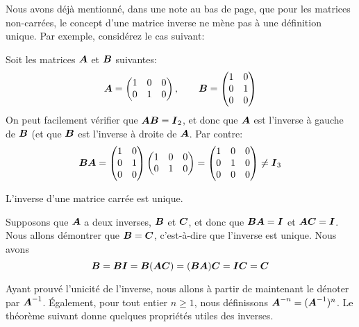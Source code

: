  Nous avons déjà mentionné, dans une note au bas de page, que pour les matrices non-carrées, le concept d'une matrice inverse ne mène pas à une définition unique.  Par exemple, considérez le cas suivant:
 \begin{exemple}
 Soit les matrices $\boldsymbol{A}$ et $\boldsymbol{B}$ suivantes:
 \[
 \boldsymbol{A} = \begin{pmatrix}
 1 & 0 & 0 \\
 0 & 1 & 0
 \end{pmatrix}
, \qquad
\boldsymbol{B} = \begin{pmatrix}
1 & 0\\
0 & 1 \\
0 & 0
\end{pmatrix}
\]
On peut facilement vérifier que $\boldsymbol{A}\boldsymbol{B} = \boldsymbol{I}_2$, et donc que
$\boldsymbol{A}$ est l'inverse à gauche de $\boldsymbol{B}$  (et que $\boldsymbol{B}$ est l'inverse
à droite de $\boldsymbol{A}$.  Par contre:
\[
\boldsymbol{B}\boldsymbol{A} = \begin{pmatrix}
1 & 0\\
0 & 1 \\
0 & 0
\end{pmatrix}
\begin{pmatrix}
 1 & 0 & 0 \\
 0 & 1 & 0
 \end{pmatrix}
 = \begin{pmatrix}
 1 & 0 & 0\\
 0 & 1 & 0\\
 0 & 0 & 0
 \end{pmatrix} \neq \boldsymbol{I}_3
 \]
 \end{exemple}
 \begin{theo}
 L'inverse d'une matrice carrée est unique.

 \proof
Supposons que $\boldsymbol{A}$ a deux inverses, $\boldsymbol{B}$ et $\boldsymbol{C}$, et donc que
 $\boldsymbol{B}\boldsymbol{A} = \boldsymbol{I}$ et $\boldsymbol{A}\boldsymbol{C}=\boldsymbol{I}$. Nous allons démontrer que $\boldsymbol{B}=\boldsymbol{C}$, c'est-à-dire que l'inverse est unique. Nous avons
 \[
 \boldsymbol{B} = \boldsymbol{B}\boldsymbol{I} = \boldsymbol{B}(\boldsymbol{A}\boldsymbol{C}) = (\boldsymbol{B}\boldsymbol{A})\boldsymbol{C} =\boldsymbol{I}\boldsymbol{C} = \boldsymbol{C}
 \]
 \cqfd
 \end{theo}
 Ayant prouvé l'unicité de l'inverse, nous allons à partir de maintenant le dénoter par $\boldsymbol{A}^{-1}$.  Également, pour tout entier $n \geq 1$, nous définissons $\boldsymbol{A}^{-n} = (\boldsymbol{A}^{-1})^n$.
 Le théorème suivant donne quelques propriétés utiles des inverses.
